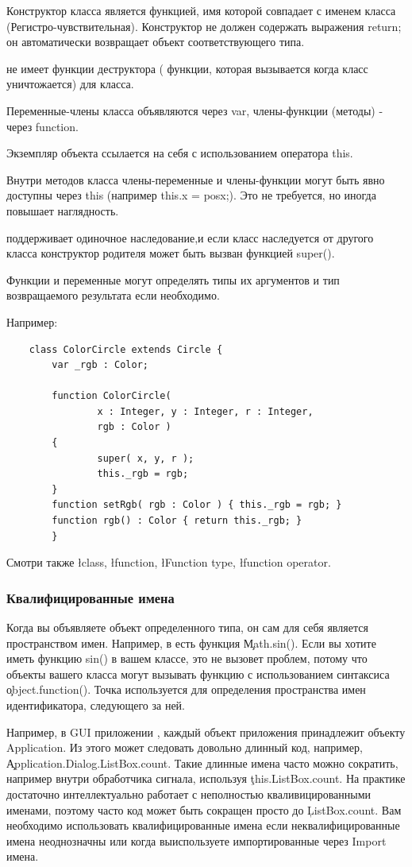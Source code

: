 \documentclass[11pt,russian,a4paper]{article}
\begin{document}
Конструктор класса является функцией, имя которой совпадает с именем класса
(Регистро-чувствительная). Конструктор не должен содержать
выражения return; он автоматически возвращает объект соответствующего
типа.

\AS не имеет функции деструктора ( функции, которая вызывается когда
класс уничтожается) для класса.

Переменные-члены класса объявляются через var, члены-функции (методы) - через
function.

Экземпляр объекта ссылается на себя с использованием оператора this.

Внутри методов класса члены-переменные и члены-функции могут быть
явно доступны через this (например this.x = posx;).
Это не требуется, но иногда повышает наглядность.

\AS поддерживает одиночное наследование,и если класс наследуется от другого класса
конструктор родителя может быть вызван функцией super().

Функции и переменные могут определять типы их аргументов
и тип возвращаемого результата если необходимо.

Например:
\begin{verbatim}
    class ColorCircle extends Circle {
        var _rgb : Color;

        function ColorCircle(
                x : Integer, y : Integer, r : Integer,
                rgb : Color )
        {
                super( x, y, r );
                this._rgb = rgb;
        }
        function setRgb( rgb : Color ) { this._rgb = rgb; }
        function rgb() : Color { return this._rgb; }
        }
\end{verbatim}

Смотри также \l class, \l function, \l{Function type}, \l{function
operator}.

\subsubsection{Квалифицированные имена}

Когда вы объявляете объект определенного типа, он сам для себя
является пространством имен. Например, в \AS есть функция
 \c Math.sin(). Если вы хотите иметь функцию sin() в вашем
 классе, это не вызовет проблем, потому что объекты вашего класса
 могут вызывать функцию с использованием синтаксиса
\c{object.function()}. Точка используется для определения пространства
имен идентификатора, следующего за ней.

Например, в GUI приложении \A , каждый объект приложения принадлежит
объекту Application. Из этого может следовать довольно длинный код,
например, \c{Application.Dialog.ListBox.count}.
Такие длинные имена часто можно сократить, например внутри
обработчика сигнала, используя \c{this.ListBox.count}.
На практике \A достаточно интеллектуально работает с неполностью
кваливицированными именами, поэтому часто код может быть сокращен
просто до \c{ListBox.count}. Вам необходимо использовать
квалифицированные имена если неквалифицированные имена неоднозначны
или когда выиспользуете импортированные через Import имена.
\end{document}
